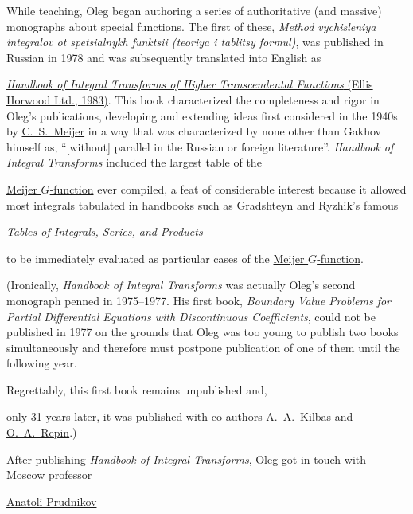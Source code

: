 While teaching, Oleg began authoring a series of authoritative (and massive) monographs about special functions. The first of these, \textit{Method vychisleniya integralov ot spetsialnykh funktsii (teoriya i tablitsy formul)}, was published in Russian in 1978 and was subsequently translated into English as 

\href{http://www.worldcat.org/title/handbook-of-integral-transforms-of-higher-transcendental-functions-theory-and-algorithmic-tables/oclc/8866416}{\textit{Handbook of Integral Transforms of Higher Transcendental Functions} (Ellis Horwood Ltd., 1983)}. This book characterized the completeness and rigor in Oleg's publications, developing and extending ideas first considered in the 1940s by \href{https://en.wikipedia.org/wiki/Cornelis_Simon_Meijer}{C.~S.~Meijer} in a way that was characterized by none other than Gakhov himself as, ``[without] parallel in the Russian or foreign literature''. \textit{Handbook of Integral Transforms} included the largest table of the 

\href{http://mathworld.wolfram.com/MeijerG-Function.html}{Meijer $G$-function} ever compiled, a feat of considerable interest because it allowed most integrals tabulated in handbooks such as Gradshteyn and Ryzhik's famous 

\href{http://www.mathtable.com/gr/}{\textit{Tables of Integrals, Series, and Products}}

to be immediately evaluated as particular cases of the \href{http://mathworld.wolfram.com/MeijerG-Function.html}{Meijer $G$-function}.



(Ironically, \textit{Handbook of Integral Transforms} was actually Oleg's second monograph penned in 1975–1977. His first book, \textit{Boundary Value Problems for Partial Differential Equations with Discontinuous Coefficients}, could not be published in 1977 on the grounds that Oleg was too young to publish two books simultaneously and therefore must postpone publication of one of them until the following year. 

Regrettably, this first book remains unpublished and, 

only 31 years later, it was published with co-authors \href{https://www.zbmath.org/?q=an:1147.35003}{A.~A.~Kilbas  and O.~A.~Repin}.)



After publishing \textit{Handbook of Integral Transforms}, Oleg got in touch with Moscow professor 

\href{https://en.wikipedia.org/wiki/Anatolii_Platonovich_Prudnikov}{Anatoli Prudnikov}

